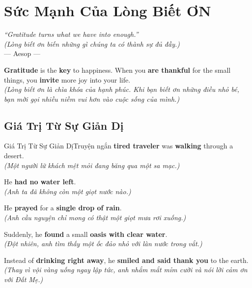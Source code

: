 \chapter{Sức Mạnh Của Lòng Biết ƠN}

\begin{center}
  \textit{\color{truyenblue}``Gratitude turns what we have into enough.''}\\
  \textit{(Lòng biết ơn biến những gì chúng ta có thành sự đủ đầy.)}\\[4pt]
  \small\color{truyengold}--- Aesop ---
\end{center}

\ngancach

\begin{tcolorbox}[
  colback=truyenred!5, colframe=truyenred!40, arc=6pt,
  title={\bfseries Hạt Giống Của Niềm Vui (Seeds of Joy)},
  fonttitle=\bfseries\color{truyenred}
]
  \textbf{Gratitude} is the \textbf{key} to happiness. When you \textbf{are thankful} for the small things, you \textbf{invite} more joy into your life.
  \\ \textit{(Lòng biết ơn là chìa khóa của hạnh phúc. Khi bạn biết ơn những điều nhỏ bé, bạn mời gọi nhiều niềm vui hơn vào cuộc sống của mình.)}
\end{tcolorbox}

\vspace{0.6cm}


\ngayDay{}
\section{Giá Trị Từ Sự Giản Dị}
\begin{truyen}{Giá Trị Từ Sự Giản Dị}{Truyện ngắn}
 \textbf{tired traveler} was \textbf{walking} through a desert.\\
\textit{(Một người lữ khách mệt mỏi đang băng qua một sa mạc.)}

He \textbf{had no water left}.\\
\textit{(Anh ta đã không còn một giọt nước nào.)}

He \textbf{prayed} for a \textbf{single drop of rain}.\\
\textit{(Anh cầu nguyện chỉ mong có thật một giọt mưa rơi xuống.)}

Suddenly, he \textbf{found} a small \textbf{oasis with clear water}.\\
\textit{(Đột nhiên, anh tìm thấy một ốc đảo nhỏ với làn nước trong vắt.)}

Instead of \textbf{drinking right away}, he \textbf{smiled and said thank you} to the earth.\\
\textit{(Thay vì vội vàng uống ngay lập tức, anh nhắm mắt mỉm cười và nói lời cảm ơn với Đất Mẹ.)}
\end{truyen}

